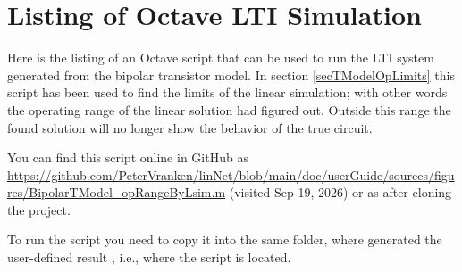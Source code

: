\chapter{Listing of Octave LTI Simulation}
\label{secListingOctaveSimulation}

Here is the listing of an Octave script that can be used to run the LTI
system generated from the bipolar transistor model. In section
\ref{secTModelOpLimits} this script has been used to find the limits of
the linear simulation; with other words the operating range of the
linear solution \linnet{} had figured out. Outside this range the found
solution will no longer show the behavior of the true circuit.

You can find this script online in GitHub as
\href{https://github.com/PeterVranken/linNet/blob/main/doc/userGuide/sources/figures/BipolarTModel\_opRangeByLsim.m}
{https://github.com/PeterVranken/linNet/blob/\-main/\-doc/\-user\-Guide/sources/fi\-gures/\-Bipolar\-TModel\_opRangeByLsim.m}
(visited Sep 19, 2026)
or as  after
cloning the \linnet{} project.

To run the script you need to copy it into the same folder, where
\linnet{} generated the user-defined result , i.e., where the
script  is located.

%


